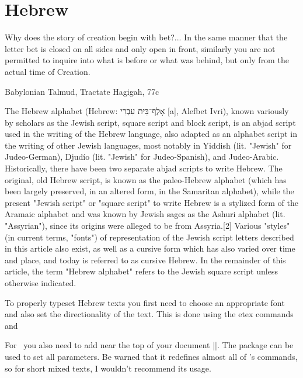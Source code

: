 \let\luatextextdir\textdir

\section{Hebrew}
\hebrew
\epigraph{Why does the story of creation begin with bet?... In the same manner that the letter bet is closed on all sides and only open in front, similarly you are not permitted to inquire into what is before or what was behind, but only from the actual time of Creation.}{Babylonian Talmud, Tractate Hagigah, 77c}

\label{s:hebrew}

The Hebrew alphabet (Hebrew:{ אָלֶף־בֵּית עִבְרִי }‎[a], Alefbet Ivri), known variously by scholars as the Jewish script, square script and block script, is an abjad script used in the writing of the Hebrew language, also adapted as an alphabet script in the writing of other Jewish languages, most notably in Yiddish (lit. "Jewish" for Judeo-German), Djudío (lit. "Jewish" for Judeo-Spanish), and Judeo-Arabic. Historically, there have been two separate abjad scripts to write Hebrew. The original, old Hebrew script, is known as the paleo-Hebrew alphabet (which has been largely preserved, in an altered form, in the Samaritan alphabet), while the present "Jewish script" or "square script" to write Hebrew is a stylized form of the Aramaic alphabet and was known by Jewish sages as the Ashuri alphabet (lit. "Assyrian"), since its origins were alleged to be from Assyria.[2] Various "styles" (in current terms, "fonts") of representation of the Jewish script letters described in this article also exist, as well as a cursive form which has also varied over time and place, and today is referred to as cursive Hebrew. In the remainder of this article, the term "Hebrew alphabet" refers to the Jewish square script unless otherwise indicated.

To properly typeset Hebrew texts you first need to choose an appropriate font and also set the directionality of the text. This
is done using the etex commands  and  

For \XeTeX\ you also need to add near the top of your document ||. The package  can be used to set all parameters. Be warned that it redefines almost all of \latexe's commands, so for short mixed texts, I wouldn't recommend its usage. 



